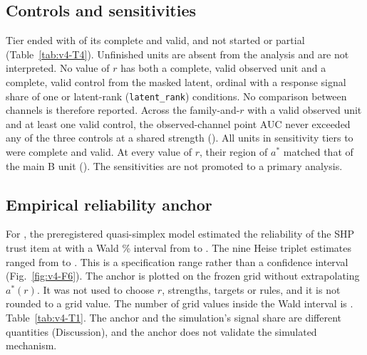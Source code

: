 \subsection{Controls and sensitivities}
Tier  ended with  of its   complete and valid, and  not started or partial (Table~\ref{tab:v4-T4}).  %
Unfinished units are absent from the analysis and are not interpreted. %
No value of $r$ has both a complete, valid observed unit and a complete, valid control from the masked latent, ordinal with a response signal share of one or latent-rank (\texttt{latent\_rank}) conditions. No comparison between channels is therefore reported. %
Across the  family-and-$r$  with a valid observed unit and at least one valid control, the observed-channel point AUC never exceeded any of the three controls at a shared strength (\allunitsresource). %
All units in sensitivity tiers  to  were complete and valid. At every value of $r$, their region of $a^*$ matched that of the main B unit (\allunitsresource). The sensitivities are not promoted to a primary analysis. %

\subsection{Empirical reliability anchor}
For , the preregistered quasi-simplex model estimated the reliability of the SHP trust item at  with a Wald \% interval from  to . The nine Heise triplet estimates ranged from  to . This is a specification range rather than a confidence interval (Fig.~\ref{fig:v4-F6}). %
The anchor is plotted on the frozen grid without extrapolating $a^*(r)$. It was not used to choose $r$, strengths, targets or rules, and it is not rounded to a grid value. %
The number of grid values inside the Wald interval is .  Table~\ref{tab:v4-T1}. %
The anchor and the simulation's signal share are different quantities (Discussion), and the anchor does not validate the simulated mechanism. %

